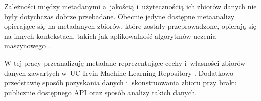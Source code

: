 Zależności między metadanymi a~jakością i~użytecznością ich zbiorów danych nie były dotychczas dobrze przebadane.
Obecnie jedyne dostępne metaanalizy opierające się na metadanych zbiorów, które zostały przeprowadzone, opierają się na innych kontekstach, takich jak aplikowalność algorytmów uczenia maszynowego \cite{brazdil1994characterizing}.

W tej pracy przeanalizuję metadane reprezentujące cechy i~własności zbiorów danych zawartych w~UC Irvin Machine Learning Repository \cite{Dua:2021}.
Dodatkowo przedstawię sposób pozyskania danych i~skonstruowania zbioru przy braku publicznie dostępnego API oraz sposób analizy takich danych.

